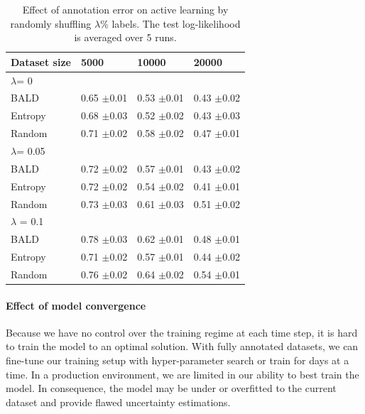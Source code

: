 \documentclass{article}
\newcommand{\std}[1]{ \normalfont \color{darkgray}\footnotesize{$\pm$#1} }
\begin{document}
\begin{table}
    \centering
    {\small
    \begin{tabular}{llll}
\toprule
Dataset size &            5000 &           10000 &           20000 \\
\midrule
     $\lambda$=               0 &                 &                 \\
     \hline
        BALD &  0.65 \std{0.01} &  0.53 \std{0.01} &  0.43 \std{0.02} \\
     Entropy &  0.68 \std{0.03} &  0.52 \std{0.02} &  0.43 \std{0.03} \\
      Random &  0.71 \std{0.02} &  0.58 \std{0.02} &  0.47 \std{0.01} \\
      \hline
     $\lambda$=            0.05 &                 &                 \\
     \hline
        BALD &  0.72 \std{0.02} &  0.57 \std{0.01} &  0.43 \std{0.02} \\
     Entropy &  0.72 \std{0.02} &  0.54 \std{0.02} &  0.41 \std{0.01} \\
      Random &  0.73 \std{0.03} &  0.61 \std{0.03} &  0.51 \std{0.02} \\
      \hline
     $\lambda$ =             0.1 &                 &                 \\
     \hline
        BALD &  0.78 \std{0.03} &  0.62 \std{0.01} &  0.48 \std{0.01} \\
     Entropy &  0.71 \std{0.02} &  0.57 \std{0.01} &  0.44 \std{0.02} \\
      Random &  0.76 \std{0.02} &  0.64 \std{0.02} &  0.54 \std{0.01} \\
\bottomrule
\end{tabular}}

    \caption{Effect of annotation error on active learning by randomly shuffling $\lambda$\% labels. The test log-likelihood is averaged over 5 runs.}
    \label{fig:labl_noise}
\end{table}


\paragraph{Effect of model convergence}

Because we have no control over the training regime at each time step, it is hard to train the model to an optimal solution. With fully annotated datasets, we can fine-tune our training setup with hyper-parameter search or train for days at a time. In a production environment, we are limited in our ability to best train the model. %
In consequence, the model may be under or overfitted to the current dataset and provide flawed uncertainty estimations. %
\end{document}
